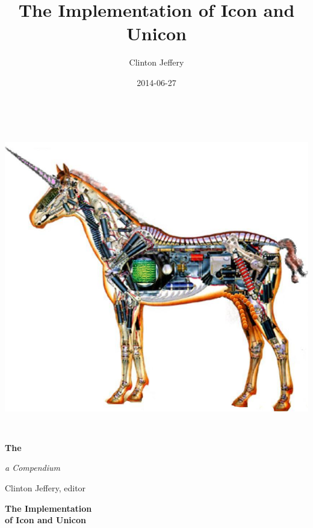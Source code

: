 \documentclass[letterpaper,twoside,12pt]{book}
\title{The Implementation of Icon and Unicon}
\author{Clinton Jeffery}
\date{2014-06-27}
\newcommand*{\TitleFont}{%
      \usefont{\encodingdefault}{\rmdefault}{b}{n}%
      \fontsize{256}{40}%
      \selectfont}
\begin{document}
\clearpage\clearpage\setcounter{page}{1}\pagestyle{KonvertFolgeii}
\thispagestyle{Konverti}
\begin{center}
\includegraphics[width=5.9992in,height=5.3402in]{ib-img/ib-img001.jpg}
\end{center}
{\color{black}
\bfseries\Huge
The \vspace{0.15in}

\noindent \TitleFont
\colorbox{blue}{\makebox[6in][r]{\parbox{6in}{\center\textcolor{white}{Implementation of\\ Icon and Unicon} \vspace{0.25in}}}}
}

\vspace{0.10in}

{\raggedleft\itshape\huge
a Compendium
\par}

\bigskip

{\raggedleft\LARGE
Clinton Jeffery, editor
\par}

\clearpage\setcounter{page}{1}\pagestyle{UnnumberedKonvertFolgeii}
\parbox{1in}{}

\clearpage

\bigskip
\bigskip
\bigskip

{\centering\bfseries\Huge
The Implementation\\
of Icon and Unicon
\par}
\end{document}
